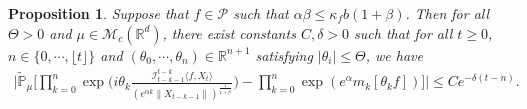 \documentclass[12pt,a4paper]{amsart}
\theoremstyle{plain}
\newtheorem{prop}[thm]{Proposition}
\theoremstyle{definition}
\numberwithin{equation}{section}
\begin{document}
\begin{prop}\label{corollary31}
Suppose that $f\in \mathcal{P}$ such that $\alpha\beta\leq\kappa_fb(1+\beta)$. Then for all $\Theta >0$ and $\mu\in \mathcal M_c(\mathbb R^d)$,
there exist constants $C,\delta>0$ such that
for all $t\geq 0$,
$n \in \{0, \cdots, \lfloor t \rfloor\}$ and $(\theta_0, \cdots, \theta_n)\in \mathbb R^{n+1}$
satisfying $|\theta_i|\leq \Theta$, we have
\begin{equation}\begin{split}
\label{32corollary}
    \Big|\mathbb{\tilde{P}}_{\mu}\Big[\prod_{k=0}^n\exp\Big(i\theta_k \frac {\mathcal I_{t-k-1}^{t-k}\langle f ,X_t\rangle}{(e^{\alpha k}\|X_{t-k-1}\|)^\frac{1}{1+\beta}}\Big)-\prod_{k=0}^n\exp(e^{\alpha}m_k[\theta_k f])\Big]\Big|\leq C e^{-\delta(t-n)}.
\end{split}\end{equation}
\end{prop}
\end{document}
